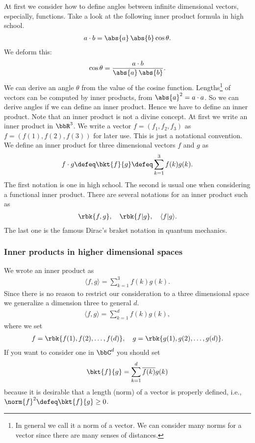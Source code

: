 \documentclass[openany, a4paper, oneside]{jsbook}
\begin{document}
At first we consider how to define angles between infinite dimensional vectors,
especially, functions.
Take a look at the following inner product formula in high school.
\begin{align}
 a \cdot b
 =
 \abs{a} \, \abs{b} \cos \theta.
\end{align}
We deform this:
\begin{align}
 \cos \theta
 =
 \frac{ a \cdot b} {\abs{a} \, \abs{b}}.
\end{align}
We can derive an angle $\theta$ from the value of the cosine function.
Lengths\footnote{In general we call it a norm of a vector.
We can consider many norms for a vector since there are many senses of distances.} of vectors can be computed by inner products,
from $\abs{a}^2 = a \cdot a$.
So we can derive angles if we can define an inner product.
Hence we have to define an inner product.
Note that an inner product is not a divine concept.
At first we write an inner product in $\bbR^3$.
We write a vector $f = (f_1, f_2, f_3)$ as $f = (f(1), f(2), f(3))$ for later use.
This is just a notational convention.
We define an inner product for three dimensional vectors $f$ and $g$ as
\begin{align}
 f \cdot g
 \defeq
 \bkt{f}{g}
 \defeq
 \sum_{k=1}^3 f(k)g(k).
\end{align}
The first notation is one in high school.
The second is usual one when considering a functional inner product.
There are several notations for an inner product such as
\begin{align}
 \rbk{f, g}, \quad \rbk{f | g}, \quad \langle f | g \rangle.
\end{align}
The last one is the famous Dirac's braket notation in quantum mechanics.
\subsubsection{Inner products in higher dimensional spaces}

We wrote an inner product as
\begin{align}
 \langle f , g \rangle
 =
 \sum_{k=1}^3 f(k)g(k).
\end{align}
Since there is no reason to restrict our consideration to a three dimensional space
we generalize a dimension three to general $d$.
\begin{align}
 \langle f , g \rangle
 =
 \sum_{k=1}^d f(k)g(k),
\end{align}
where we set
\begin{align}
 f = \rbk{f(1), f(2), \dots, f(d)}, \quad
 g = \rbk{g(1), g(2), \dots, g(d)}.
\end{align}
If you want to consider one in $\bbC^d$ you should set
\begin{align}
 \bkt{f}{g}
 =
 \sum_{k=1}^d \overline{f(k)} g(k)
\end{align}
because it is desirable that a length (norm) of a vector is
properly defined, i.e., $\norm{f}^2 \defeq \bkt{f}{g} \geq 0$.
\end{document}
